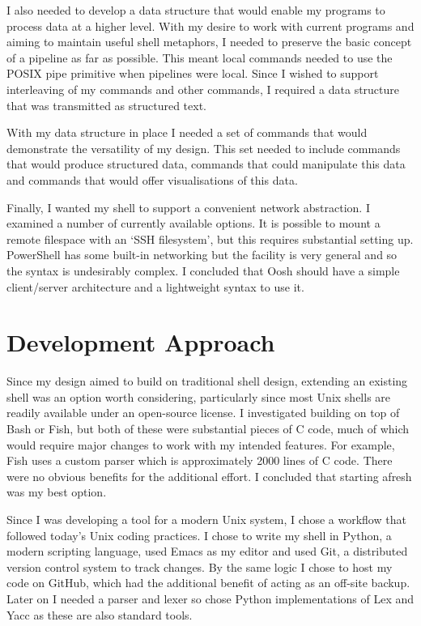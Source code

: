 \documentclass[12pt,twoside,notitlepage]{report}
\begin{document}
I also needed to develop a data structure that would enable my
programs to process data at a higher level. With my desire to work
with current programs and aiming to maintain useful shell metaphors, I
needed to preserve the basic concept of a pipeline as far as
possible. This meant local commands needed to use the POSIX pipe
primitive when pipelines were local. Since I wished to support
interleaving of my commands and other commands, I required a data
structure that was transmitted as structured text.

With my data structure in place I needed a set of commands that would
demonstrate the versatility of my design. This set needed to include commands
that would produce structured data, commands that could manipulate this data and
commands that would offer visualisations of this data.

Finally, I wanted my shell to support a convenient network
abstraction. I examined a number of currently available options. It is
possible to mount a remote filespace with an `SSH filesystem', but
this requires substantial setting up. PowerShell has some built-in
networking but the facility is very general and so the syntax is
undesirably complex. I concluded that Oosh should have a simple client/server
architecture and a lightweight syntax to use it.

\section{Development Approach}
Since my design aimed to build on traditional shell design, extending
an existing shell was an option worth considering, particularly since
most Unix shells are readily available under an open-source license. I
investigated building on top of Bash or Fish, but both of these were
substantial pieces of C code, much of which would require major
changes to work with my intended features. For example, Fish uses a
custom parser which is approximately 2000 lines of C code. There were
no obvious benefits for the additional effort. I concluded that
starting afresh was my best option.

Since I was developing a tool for a modern Unix system, I chose a
workflow that followed today's Unix coding practices. I chose to write
my shell in Python, a modern scripting language, used Emacs as my
editor and used Git, a distributed version control system to track
changes. By the same logic I chose to host my code on GitHub, which
had the additional benefit of acting as an off-site backup. Later on I
needed a parser and lexer so chose Python implementations of Lex and
Yacc as these are also standard tools.
\end{document}
